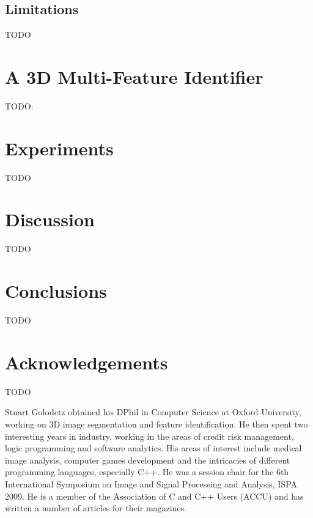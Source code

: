 \documentclass[10pt,twocolumn,twoside]{IEEEtran}
\begin{document}
\subsection{Limitations}

TODO

\section{A 3D Multi-Feature Identifier}

TODO: \cite{golodetz11}

\section{Experiments}

TODO

\section{Discussion}

TODO

\section{Conclusions}

TODO

\section{Acknowledgements}

TODO

\clearpage




\vspace{1cm}

\begin{IEEEbiography}{Stuart Golodetz}
obtained his DPhil in Computer Science at Oxford University, working on 3D image segmentation and feature identification. He then spent two interesting years in industry, working in the areas of credit risk management, logic programming and software analytics. His areas of interest include medical image analysis, computer games development and the intricacies of different programming languages, especially C++. He was a session chair for the 6th International Symposium on Image and Signal Processing and Analysis, ISPA 2009. He is a member of the Association of C and C++ Users (ACCU) and has written a number of articles for their magazines.
\end{IEEEbiography}
\end{document}

